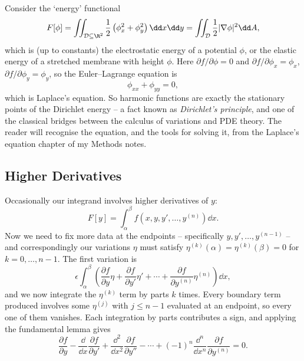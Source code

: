 \begin{example}
	Consider the `energy' functional
	$$
	F[\phi] = \iint_{\mathcal D \subseteq \R^2}\frac{1}{2}\left(\phi_x^2 + \phi_y^2\right)\dd x \dd y = \iint_{\mathcal D}\frac 12 |\nabla \phi|^2 \dd A,
	$$
	which is (up to constants) the electrostatic energy of a potential $\phi$, or the elastic energy of a stretched membrane with height $\phi$. Here $\partial f/\partial\phi = 0$ and $\partial f/\partial \phi_x = \phi_x$, $\partial f/\partial \phi_y = \phi_y$, so the Euler--Lagrange equation is
	$$
	\phi_{xx} + \phi_{yy} = 0,
	$$
	which is Laplace's equation. So harmonic functions are exactly the stationary points of the Dirichlet energy -- a fact known as \emph{Dirichlet's principle}, and one of the classical bridges between the calculus of variations and PDE theory. The reader will recognise the equation, and the tools for solving it, from the Laplace's equation chapter of my Methods notes.
\end{example}

\subsection{Higher Derivatives}

Occasionally our integrand involves higher derivatives of $y$:
$$
F[y] = \int_\alpha^\beta f\left(x, y, y', \dots, y^{(n)}\right)\dd x.
$$
Now we need to fix more data at the endpoints -- specifically $y, y', \dots, y^{(n-1)}$ -- and correspondingly our variations $\eta$ must satisfy $\eta^{(k)}(\alpha) = \eta^{(k)}(\beta) = 0$ for $k = 0, \dots, n-1$. The first variation is
$$
\epsilon\int_\alpha^\beta\left(\frac{\partial f}{\partial y}\eta + \frac{\partial f}{\partial y'}\eta' + \cdots + \frac{\partial f}{\partial y^{(n)}}\eta^{(n)}\right)\dd x,
$$
and we now integrate the $\eta^{(k)}$ term by parts $k$ times. Every boundary term produced involves some $\eta^{(j)}$ with $j \leq n-1$ evaluated at an endpoint, so every one of them vanishes. Each integration by parts contributes a sign, and applying the fundamental lemma gives
$$
\frac{\partial f}{\partial y} - \frac{\dd}{\dd x}\frac{\partial f}{\partial y'} + \frac{\dd^2}{\dd x^2}\frac{\partial f}{\partial y''} - \cdots + (-1)^n \frac{\dd^n}{\dd x^n}\frac{\partial f}{\partial y^{(n)}} = 0.
$$

